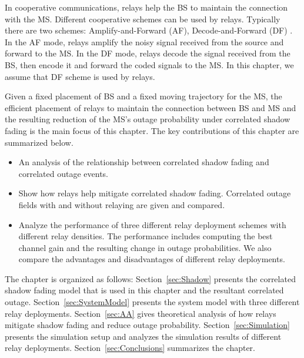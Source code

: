 \par In cooperative communications, relays help the BS to maintain the connection with the MS. Different cooperative schemes can be used by relays. Typically there are two schemes: Amplify-and-Forward (AF), Decode-and-Forward (DF) \cite{nosratinia2004cooperative}. In the AF mode, relays amplify the noisy signal received from the source and forward to the MS. In the DF mode, relays decode the signal received from the BS, then encode it and forward the coded signals to the MS. In this chapter, we assume that DF scheme is used by relays.
\par Given a fixed placement of BS and a fixed moving trajectory for the MS, the efficient placement of relays to maintain the connection between BS and MS and the resulting reduction of the MS's outage probability under correlated shadow fading is the main focus of this chapter. The key contributions of this chapter are summarized below.
\begin{itemize}
\item An analysis of the relationship between correlated shadow fading and correlated outage events.
\item Show how relays help mitigate correlated shadow fading. Correlated outage fields with and without relaying are given and compared.
\item Analyze the performance of three different relay deployment schemes with different relay densities. The performance includes computing the best channel gain and the resulting change in outage probabilities. We also compare the advantages and disadvantages of different relay deployments.
\end{itemize}
The chapter is organized as follows: Section~\ref{sec:Shadow} presents the correlated shadow fading model that is used in this chapter and the resultant correlated outage. Section~\ref{sec:SystemModel} presents the system model with three different relay deployments. Section~\ref{sec:AA} gives theoretical analysis of how relays mitigate shadow fading and reduce outage probability. Section~\ref{sec:Simulation} presents the simulation setup and analyzes the simulation results of different relay deployments. Section~\ref{sec:Conclusions} summarizes the chapter.
